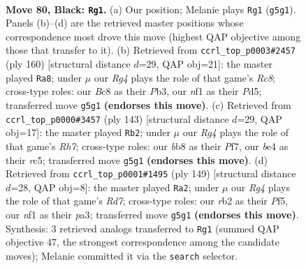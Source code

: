 \documentclass[11pt]{article}
\begin{document}
\clearpage

\begin{figure}[p]\centering
\begin{subfigure}{0.46\textwidth}\centering
\resizebox{\linewidth}{!}{%
\newchessgame
\chessboard[
  setfen={1Bb5/5k2/8/1P4r1/P3B3/2K4p/1R6/5N2 b - - 0 80},
  showmover=false,
  pgfstyle=straightmove, color=movearrow, markmove={g5-g1}
]}
\caption{}
\end{subfigure}\hfill
\begin{subfigure}{0.46\textwidth}\centering
\resizebox{\linewidth}{!}{%
\newchessgame
\chessboard[
  setfen={2R5/1r4b1/3pP3/3P2k1/1p6/1Pp1K3/2B5/8 w - - 32 81},
  showmover=false,
  pgfstyle=straightmove, color=movearrow, markmove={c8-a8}
]}
\caption{}
\end{subfigure}
\\[4pt]
\begin{subfigure}{0.46\textwidth}\centering
\resizebox{\linewidth}{!}{%
\newchessgame
\chessboard[
  setfen={8/5p1p/4k2P/2R5/1P2b3/4B3/7r/4K3 b - - 2 72},
  showmover=false,
  pgfstyle=straightmove, color=movearrow, markmove={h2-b2}
]}
\caption{}
\end{subfigure}\hfill
\begin{subfigure}{0.46\textwidth}\centering
\resizebox{\linewidth}{!}{%
\newchessgame
\chessboard[
  setfen={8/1B2k3/4p3/4bp2/1P6/PR6/3r1P2/5K2 b - - 24 75},
  showmover=false,
  pgfstyle=straightmove, color=movearrow, markmove={d2-a2}
]}
\caption{}
\end{subfigure}
\caption{\textbf{Move 80, Black: \texttt{Rg1}.} (a) Our position; Melanie plays \texttt{Rg1} (\texttt{g5g1}). Panels (b)--(d) are the retrieved master positions whose correspondence most drove this move (highest QAP objective among those that transfer to it). (b) Retrieved from \texttt{ccrl\_top\_p0003\#2457} (ply 160) [structural distance $d$=29, QAP obj=21]: the master played \texttt{Ra8}; under $\mu$ our \emph{Rg4} plays the role of that game's \emph{Rc8}; cross-type roles: our \emph{B}c8 as their \emph{P}b3, our \emph{n}f1 as their \emph{P}d5; transferred move \texttt{g5g1} \textbf{(endorses this move)}. (c) Retrieved from \texttt{ccrl\_top\_p0000\#3457} (ply 143) [structural distance $d$=29, QAP obj=17]: the master played \texttt{Rb2}; under $\mu$ our \emph{Rg4} plays the role of that game's \emph{Rh7}; cross-type roles: our \emph{b}b8 as their \emph{P}f7, our \emph{b}e4 as their \emph{r}c5; transferred move \texttt{g5g1} \textbf{(endorses this move)}. (d) Retrieved from \texttt{ccrl\_top\_p0001\#1495} (ply 149) [structural distance $d$=28, QAP obj=8]: the master played \texttt{Ra2}; under $\mu$ our \emph{Rg4} plays the role of that game's \emph{Rd7}; cross-type roles: our \emph{r}b2 as their \emph{P}f5, our \emph{n}f1 as their \emph{p}a3; transferred move \texttt{g5g1} \textbf{(endorses this move)}. Synthesis: 3 retrieved analogs transferred to \texttt{Rg1} (summed QAP objective 47, the strongest correspondence among the candidate moves); Melanie committed it via the \texttt{search} selector.}
\label{fig:thought-m159}
\end{figure}
\end{document}
